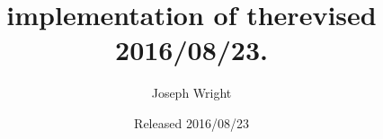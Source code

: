 \documentclass[a4paper]{ltxdoc}
\author{Joseph Wright}
\title{implementation of therevised 2016/08/23.}
\date{Released 2016/08/23}
\begin{document}
\maketitle
\cite{Geim2007}


\printbibliography
\end{document}
